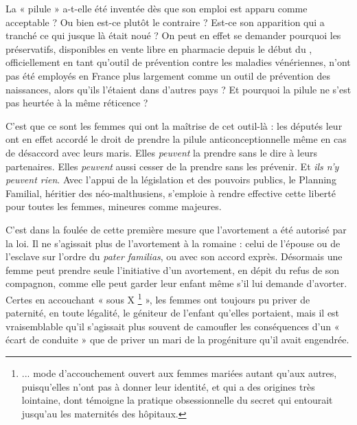  La « pilule » a-t-elle été inventée dès que son emploi est apparu comme acceptable ? Ou bien est-ce plutôt le contraire ? Est-ce son apparition qui a tranché ce qui jusque là était noué ? On peut en effet se demander pourquoi les préservatifs, disponibles en vente libre en pharmacie depuis le début du , officiellement en tant qu'outil de prévention contre les maladies vénériennes, n'ont pas été employés en France plus largement comme un outil de prévention des naissances, alors qu'ils l'étaient dans d'autres pays ? Et pourquoi la pilule ne s'est pas heurtée à la même réticence ? 

 C'est que ce sont les femmes qui ont la maîtrise de cet outil-là : les députés leur ont en effet accordé le droit de prendre la pilule anticonceptionnelle même en cas de désaccord avec leurs maris. Elles \emph{peuvent} la prendre sans le dire à leurs partenaires. Elles \emph{peuvent} aussi cesser de la prendre sans les prévenir. Et\emph{ ils n'y peuvent rien}. Avec l'appui de la législation et des pouvoirs publics, le Planning Familial, héritier des néo-malthusiens, s'emploie à rendre effective cette liberté pour toutes les femmes, mineures comme majeures. 

 C'est dans la foulée de cette première mesure que l'avortement a été autorisé par la loi. Il ne s'agissait plus de l'avortement à la romaine : celui de l'épouse ou de l'esclave sur l'ordre du \emph{pater familias}, ou avec son accord exprès. Désormais une femme peut prendre seule l'initiative d'un avortement, en dépit du refus de son compagnon, comme elle peut garder leur enfant même s'il lui demande d'avorter. Certes en accouchant « sous X%
\footnote{... mode d'accouchement ouvert aux femmes mariées autant qu'aux autres, puisqu'elles n'ont pas à donner leur identité, et qui a des origines très lointaine, dont témoigne la pratique obsessionnelle du secret qui entourait jusqu'au  les maternités des hôpitaux.}
 », les femmes ont toujours pu priver de paternité, en toute légalité, le géniteur de l'enfant qu'elles portaient, mais il est vraisemblable qu'il s'agissait plus souvent de camoufler les conséquences d'un « écart de conduite » que de priver un mari de la progéniture qu'il avait engendrée.


